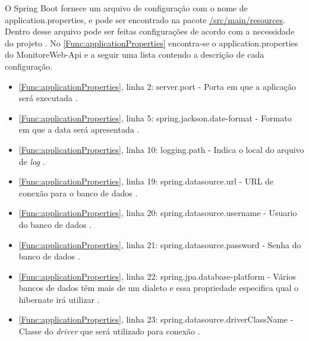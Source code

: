 O Spring Boot fornece um arquivo de configuração com o nome de application.properties, e pode ser encontrado na pacote \url{/src/main/resources}. Dentro desse arquivo pode ser feitas configurações de acordo com a necessidade do projeto \cite{springBoot:2017}. No \autoref{Func:applicationProperties} encontra-se o application.properties do MonitoreWeb-Api e a seguir uma lista contendo a descrição de cada configuração.

\begin{itemize}
		\item \autoref{Func:applicationProperties}, linha 2: server.port - Porta em que a aplicação será executada \cite{springBoot:2017}.
		
		\item \autoref{Func:applicationProperties}, linha 5: spring.jackson.date-format - Formato em que a data será apresentada \cite{springBoot:2017}.
		
		\item \autoref{Func:applicationProperties}, linha 10: logging.path - Indica o local do arquivo de \textit{log} \cite{springBoot:2017}.
		
		\item \autoref{Func:applicationProperties}, linha 19: spring.datasource.url - URL de conexão para o banco de dados \cite{springBoot:2017}.
		
		\item \autoref{Func:applicationProperties}, linha 20: spring.datasource.username - Usuario do banco de dados \cite{springBoot:2017}.
		
		\item \autoref{Func:applicationProperties}, linha 21: spring.datasource.password - Senha do banco de dados \cite{springBoot:2017}.
		
		\item \autoref{Func:applicationProperties}, linha 22: spring.jpa.database-platform - Vários bancos de dados têm mais de um dialeto e essa propriedade especifica qual o hibernate irá utilizar \cite{springBoot:2017}.
		
		\item \autoref{Func:applicationProperties}, linha 23: spring.datasource.driverClassName - Classe do \textit{driver} que será utilizado para conexão \cite{springBoot:2017}.
		
\end{itemize}

